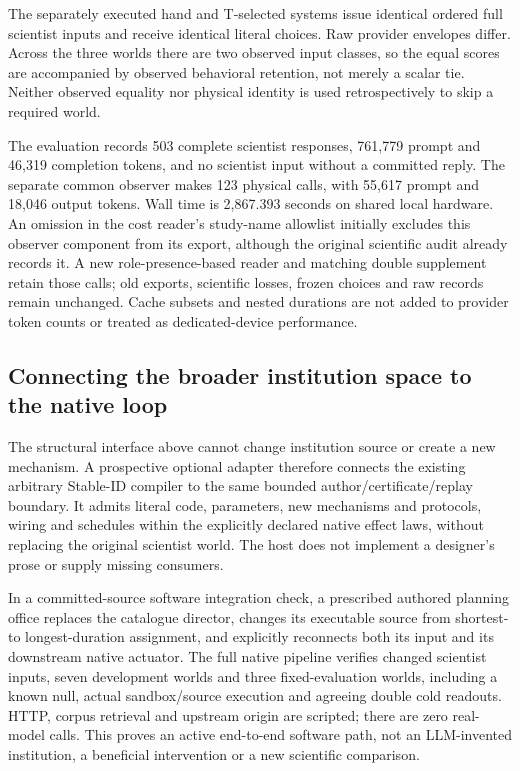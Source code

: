 The separately executed hand and T-selected systems issue identical ordered
full scientist inputs and receive identical literal choices. Raw provider
envelopes differ. Across the three worlds there are two observed input
classes, so the equal scores are accompanied by observed behavioral retention,
not merely a scalar tie. Neither observed equality nor physical identity is
used retrospectively to skip a required world.

The evaluation records 503 complete scientist responses, 761,779 prompt and
46,319 completion tokens, and no scientist input without a committed reply.
The separate common observer makes 123 physical calls, with 55,617 prompt and
18,046 output tokens. Wall time is 2,867.393 seconds on shared local hardware.
An omission in the cost reader's study-name allowlist initially excludes this
observer component from its export, although the original scientific audit
already records it. A new role-presence-based reader and matching double
supplement retain those calls; old exports, scientific losses, frozen choices
and raw records remain unchanged. Cache subsets and nested durations are not
added to provider token counts or treated as dedicated-device performance.

\subsection{Connecting the broader institution space to the native loop}
The structural interface above cannot change institution source or create a
new mechanism. A prospective optional  adapter
therefore connects the existing arbitrary Stable-ID compiler to the same
bounded author/certificate/replay boundary. It admits literal code, parameters,
new mechanisms and protocols, wiring and schedules within the explicitly
declared native effect laws, without replacing the original scientist world.
The host does not implement a designer's prose or supply missing consumers.

In a committed-source software integration check, a prescribed authored
planning office replaces the catalogue director, changes its executable source
from shortest- to longest-duration assignment, and explicitly reconnects both
its input and its downstream native actuator. The full native pipeline verifies
changed scientist inputs, seven development worlds and three fixed-evaluation
worlds, including a known null, actual sandbox/source execution and agreeing
double cold readouts. HTTP, corpus retrieval and upstream origin are scripted;
there are zero real-model calls. This proves an active end-to-end software
path, not an LLM-invented institution, a beneficial intervention or a new
scientific comparison.

